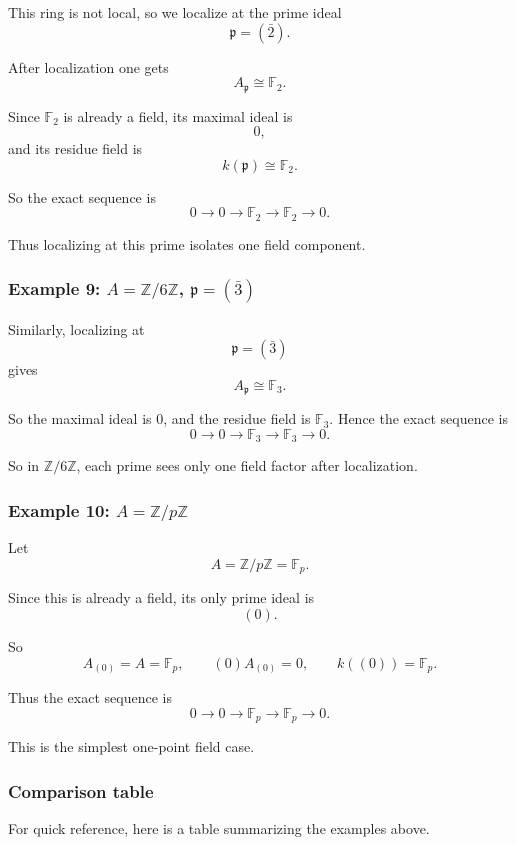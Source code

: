 \documentclass[12pt,a4paper]{article}
\theoremstyle{notespace}
\newcommand{\mf}{\mathfrak}
\theoremstyle{definition}
\begin{document}
This ring is not local, so we localize at the prime ideal
\[
\mf p=(\bar 2).
\]

After localization one gets
\[
A_{\mf p}\cong \mathbb F_2.
\]

Since \(\mathbb F_2\) is already a field, its maximal ideal is
\[
0,
\]
and its residue field is
\[
k(\mf p)\cong \mathbb F_2.
\]

So the exact sequence is
\[
0
\longrightarrow
0
\longrightarrow
\mathbb F_2
\longrightarrow
\mathbb F_2
\longrightarrow 0.
\]

Thus localizing at this prime isolates one field component.

\subsubsection{Example 9: \(A=\mathbb Z/6\mathbb Z\), \(\mf p=(\bar 3)\)}

Similarly, localizing at
\[
\mf p=(\bar 3)
\]
gives
\[
A_{\mf p}\cong \mathbb F_3.
\]

So the maximal ideal is \(0\), and the residue field is \(\mathbb F_3\).  
Hence the exact sequence is
\[
0
\longrightarrow
0
\longrightarrow
\mathbb F_3
\longrightarrow
\mathbb F_3
\longrightarrow 0.
\]

So in \(\mathbb Z/6\mathbb Z\), each prime sees only one field factor after localization.

\subsubsection{Example 10: \(A=\mathbb Z/p\mathbb Z\)}

Let
\[
A=\mathbb Z/p\mathbb Z=\mathbb F_p.
\]

Since this is already a field, its only prime ideal is
\[
(0).
\]

So
\[
A_{(0)}=A=\mathbb F_p,
\qquad
(0)A_{(0)}=0,
\qquad
k((0))=\mathbb F_p.
\]

Thus the exact sequence is
\[
0
\longrightarrow
0
\longrightarrow
\mathbb F_p
\longrightarrow
\mathbb F_p
\longrightarrow 0.
\]

This is the simplest one-point field case.

\subsubsection{Comparison table}

For quick reference, here is a table summarizing the examples above.
\end{document}
